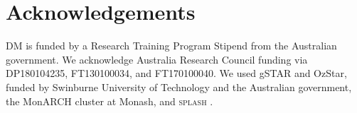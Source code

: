 \documentclass[usenatbib,a4paper,times]{mnras}
\begin{document}
\section*{Acknowledgements}

DM is funded by a Research Training Program Stipend from the Australian
government. We acknowledge Australia Research Council funding via DP180104235,
FT130100034, and FT170100040. We used gSTAR and OzStar, funded by Swinburne
University of Technology and the Australian government, the MonARCH cluster at
Monash, and \textsc{splash} \citep{price:2007}.



\label{lastpage}
\end{document}
